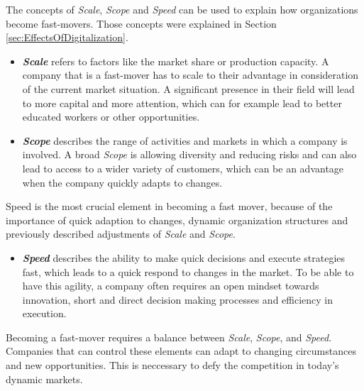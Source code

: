 \documentclass[a4]{scrartcl}
\begin{document}
	The concepts of \textit{Scale}, \textit{Scope} and \textit{Speed} can be used to explain how organizations become fast-movers. Those concepts were explained in Section \ref{sec:EffectsOfDigitalization}.
	
	\begin{itemize}
		\item \textit{\textbf{Scale}} refers to factors like the market share or production capacity. A company that is a fast-mover has to scale to their advantage in consideration of the current market situation. A significant presence in their field will lead to more capital and more attention, which can for example lead to better educated workers or other opportunities. \cite{fastmovers, digitalmatrix}
		
		
		
		\item \textit{\textbf{Scope}}  describes the range of activities and markets in which a company is involved. A broad \textit{Scope} is allowing diversity and reducing risks and can also lead to access to a wider variety of customers, which can be an advantage when the company quickly adapts to changes. \cite{fastmovers, digitalmatrix}
		
		
	\end{itemize}

	Speed is the most crucial element in becoming a fast mover, because of the importance of quick adaption to changes, dynamic organization structures and previously described adjustments of \textit{Scale} and \textit{Scope}. \cite{fastmovers, digitalmatrix}

	\begin{itemize}
		\item \textit{\textbf{Speed}} describes the ability to make quick decisions and execute strategies fast, which leads to a quick respond to changes in the market. To be able to have this agility, a company often requires an open mindset towards innovation, short and direct decision making processes and efficiency in execution. \cite{fastmovers, digitalmatrix, wiwi}
		
		
	\end{itemize}

Becoming a fast-mover requires a balance between \textit{Scale}, \textit{Scope}, and \textit{Speed}. Companies that can control these elements can adapt to changing circumstances and new opportunities. This is neccessary to defy the competition in today's dynamic markets.


	
\end{document}
